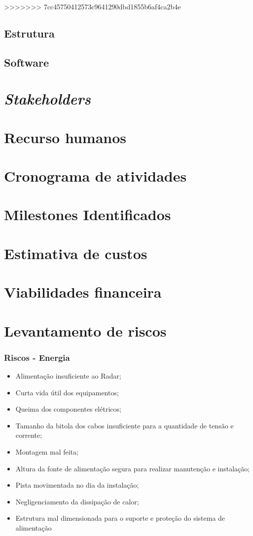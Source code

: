 	\vspace*{\fill}
    \pagebreak
    
>>>>>>> 7cc45750412573c9641290dbd1855b6af4ca2b4e
\subsection{Estrutura}
\subsection{Software}
\section{\emph{Stakeholders}}
\section{Recurso humanos}
\section{Cronograma de atividades}
\section{Milestones Identificados}
\section{Estimativa de custos}
\section{Viabilidades financeira}
\section{Levantamento de riscos}
\subsubsection{Riscos - Energia}
\begin{itemize}
   \item Alimentação insuficiente ao Radar;
   \item Curta vida útil dos equipamentos; 
   \item Queima dos componentes elétricos;
   \item Tamanho da bitola dos cabos insuficiente para a quantidade de tensão e corrente;
   \item Montagem mal feita;
   \item Altura da fonte de alimentação segura para realizar manutenção e instalação;
   \item Pista movimentada no dia da instalação;
   \item Negligenciamento da dissipação de calor;
   \item Estrutura mal dimensionada para o suporte e proteção do sistema de alimentação
 \end{itemize}
